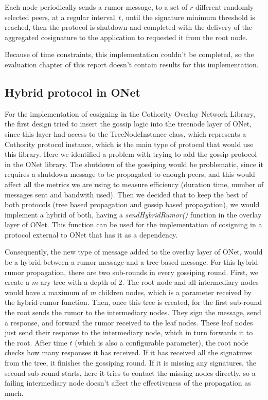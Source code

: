 Each node periodically sends a rumor message, to a set of $r$ different randomly selected peers, at a regular interval~$t$, until the signature minimum threshold is reached, then the protocol is shutdown and completed with the delivery of the aggregated cosignature to the application to requested it from the root node.

Because of time constraints, this implementation couldn't be completed, so the evaluation chapter of this report doesn't contain results for this implementation.

\subsection{Hybrid protocol in ONet}

For the implementation of cosigning in the Cothority Overlay Network Library, the first design tried to insert the gossip logic into the treenode layer of ONet, since this layer had access to the TreeNodeInstance class, which represents a Cothority protocol instance, which is the main type of protocol that would use this library. Here we identified a problem with trying to add the gossip protocol in the ONet library. The shutdown of the gossiping would be problematic, since it requires a shutdown message to be propagated to enough peers, and this would affect all the metrics we are using to measure efficiency (duration time, number of messages sent and bandwith used).
Then we decided that to keep the best of both protocols (tree based propagation and gossip based propagation), we would implement a hybrid of both, having a \emph{sendHybridRumor()} function in the overlay layer of ONet. This function can be used for the implementation of cosigning in a protocol external to ONet that has it as a dependency.

Consequently, the new type of message added to the overlay layer of ONet, would be a hybrid between a rumor message and a tree-based message. For this hybrid-rumor propagation, there are two sub-rounds in every gossiping round. First, we create a $m$-ary tree with a depth of 2. The root node and all intermediary nodes would have a maximum of \emph{m} children nodes, which is a parameter received by the hybrid-rumor function. Then, once this tree is created, for the first sub-round the root sends the rumor to the intermediary nodes. They sign the message, send a response, and forward the rumor received to the leaf nodes.
These leaf nodes just send their response to the intermediary node, which in turn forwards it to the root. After time $t$ (which is also a configurable parameter), the root node checks how many responses it has received. If it has received all the signatures from the tree, it finishes the gossiping round. If it is missing any signatures, the second sub-round starts, here it tries to contact the missing nodes directly, so a failing intermediary node doesn't affect the effectiveness of the propagation as much.

